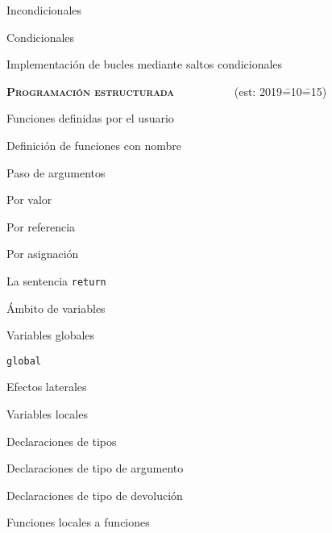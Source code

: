 \begin{longenum}
\begin{longenum}
\begin{longenum}
            \item Incondicionales
            \item Condicionales
            \item Implementación de bucles mediante saltos condicionales
        \end{longenum}
    \end{longenum}
    \item \textbf{\textsc{Programación estructurada}} \ \ \ \ \ \ \ \ \ \ (est: 2019\==10\==15)
    \begin{longenum}
        \item Funciones definidas por el usuario
        \begin{longenum}
            \item Definición de funciones con nombre
            \item Paso de argumentos
            \begin{longenum}
                \item Por valor
                \item Por referencia
                \item Por asignación
            \end{longenum}
            \item La sentencia \texttt{return}
            \item Ámbito de variables
            \begin{longenum}
                \item Variables globales
                \begin{longenum}
                    \item \texttt{global}
                    \item Efectos laterales
                \end{longenum}
                \item Variables locales
            \end{longenum}
            \item Declaraciones de tipos
            \begin{longenum}
                \item Declaraciones de tipo de argumento
                \item Declaraciones de tipo de devolución
            \end{longenum}
            \item Funciones locales a funciones
            \begin{longenum}

\end{longenum}
\end{longenum}
\end{longenum}
\end{longenum}
